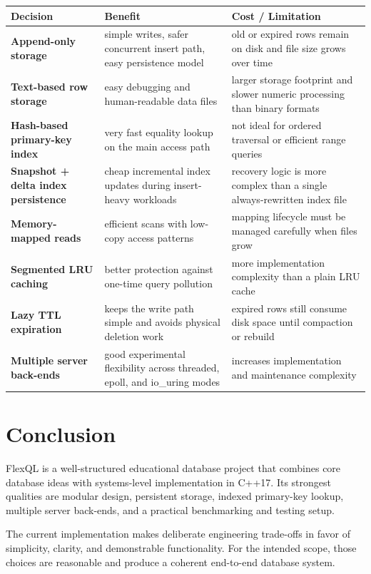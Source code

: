\documentclass[12pt,a4paper]{article}
\begin{document}
\begin{center}
\renewcommand{\arraystretch}{1.35}
\begin{tabularx}{\textwidth}{>{\bfseries}p{3.2cm}X X}
\toprule
Decision & Benefit & Cost / Limitation \\
\midrule
Append-only storage &
simple writes, safer concurrent insert path, easy persistence model &
old or expired rows remain on disk and file size grows over time \\

Text-based row storage &
easy debugging and human-readable data files &
larger storage footprint and slower numeric processing than binary formats \\

Hash-based primary-key index &
very fast equality lookup on the main access path &
not ideal for ordered traversal or efficient range queries \\

Snapshot + delta index persistence &
cheap incremental index updates during insert-heavy workloads &
recovery logic is more complex than a single always-rewritten index file \\

Memory-mapped reads &
efficient scans with low-copy access patterns &
mapping lifecycle must be managed carefully when files grow \\

Segmented LRU caching &
better protection against one-time query pollution &
more implementation complexity than a plain LRU cache \\

Lazy TTL expiration &
keeps the write path simple and avoids physical deletion work &
expired rows still consume disk space until compaction or rebuild \\

Multiple server back-ends &
good experimental flexibility across threaded, epoll, and io\_uring modes &
increases implementation and maintenance complexity \\
\bottomrule
\end{tabularx}
\end{center}

\section{Conclusion}

FlexQL is a well-structured educational database project that combines core
database ideas with systems-level implementation in C++17. Its strongest
qualities are modular design, persistent storage, indexed primary-key lookup,
multiple server back-ends, and a practical benchmarking and testing setup.

The current implementation makes deliberate engineering trade-offs in favor of
simplicity, clarity, and demonstrable functionality. For the intended scope,
those choices are reasonable and produce a coherent end-to-end database system.
\end{document}
